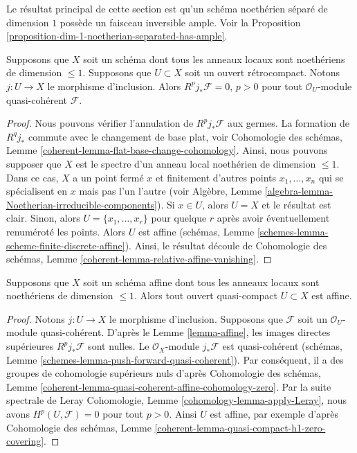 \noindent
Le résultat principal de cette section est qu'un
schéma noethérien séparé de dimension $1$ possède un
faisceau inversible ample. Voir la Proposition
\ref{proposition-dim-1-noetherian-separated-has-ample}.

\begin{lemma}
\label{lemma-affine}
Supposons que $X$ soit un schéma dont tous les anneaux locaux sont
noethériens de dimension $\leq 1$. Supposons que $U \subset X$ soit un ouvert
rétrocompact. Notons $j : U \to X$ le morphisme d'inclusion. Alors
$R^pj_*\mathcal{F} = 0$, $p > 0$ pour tout $\mathcal{O}_U$-module quasi-cohérent $\mathcal{F}$.
\end{lemma}

\begin{proof}
Nous pouvons vérifier l'annulation de $R^pj_*\mathcal{F}$
aux germes. La formation de $R^qj_*$ commute avec le
changement de base plat, voir Cohomologie des schémas, Lemme
\ref{coherent-lemma-flat-base-change-cohomology}. Ainsi,
nous pouvons supposer que $X$ est le spectre d'un anneau
local noethérien de dimension $\leq 1$. Dans ce cas, $X$ a un
point fermé $x$ et finitement d'autres points $x_1, \ldots,
x_n$ qui se spécialisent en $x$ mais pas l'un l'autre (voir
Algèbre, Lemme
\ref{algebra-lemma-Noetherian-irreducible-components}). Si $x \in U$,
alors $U = X$ et le résultat est clair. Sinon, alors $U = \{x_1,
\ldots, x_r\}$ pour quelque $r$ après avoir éventuellement renuméroté
les points. Alors $U$ est affine (schémas, Lemme
\ref{schemes-lemma-scheme-finite-discrete-affine}). Ainsi, le résultat découle
de Cohomologie des schémas, Lemme \ref{coherent-lemma-relative-affine-vanishing}.
\end{proof}

\begin{lemma}
\label{lemma-open-in-affine-curve-affine}
Supposons que $X$ soit un schéma affine dont tous les anneaux locaux sont
noethériens de dimension $\leq 1$. Alors tout ouvert quasi-compact $U \subset X$ est affine.
\end{lemma}

\begin{proof}
Notons $j : U \to X$ le morphisme d'inclusion.
Supposons que $\mathcal{F}$ soit un
$\mathcal{O}_U$-module quasi-cohérent. D'après le
Lemme \ref{lemma-affine}, les images directes
supérieures $R^pj_*\mathcal{F}$ sont nulles. Le
$\mathcal{O}_X$-module $j_*\mathcal{F}$ est
quasi-cohérent (schémas, Lemme
\ref{schemes-lemma-push-forward-quasi-coherent}). Par
conséquent, il a des groupes de cohomologie supérieurs nuls
d'après Cohomologie des schémas, Lemme
\ref{coherent-lemma-quasi-coherent-affine-cohomology-zero}. Par
la suite spectrale de Leray Cohomologie, Lemme
\ref{cohomology-lemma-apply-Leray}, nous avons $H^p(U, \mathcal{F}) = 0$
pour tout $p > 0$. Ainsi $U$ est affine, par exemple d'après Cohomologie
des schémas, Lemme \ref{coherent-lemma-quasi-compact-h1-zero-covering}.
\end{proof}

